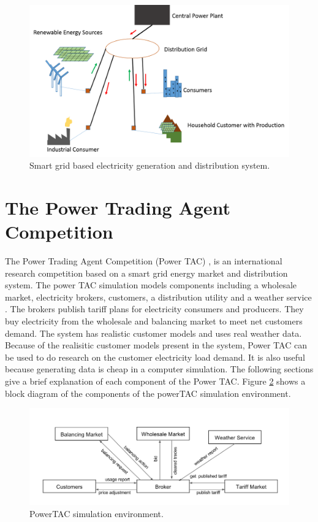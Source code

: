 \begin{figure}[h]
  \includegraphics[width=\linewidth]{smart-grid.png}
  \caption{Smart grid based electricity generation and distribution system.}
  \label{fig:smartgrid}
\end{figure}

\section{The Power Trading Agent Competition}

The Power Trading Agent Competition (Power TAC) \cite{ketter2013power, ketter20162016}, is an international research competition based on a smart grid energy market and distribution system. The power TAC simulation models components including a wholesale market, electricity brokers, customers, a distribution utility and a weather service \cite{ketter20162016}. The brokers publish tariff plans for electricity consumers and producers. They buy electricity from the wholesale and balancing market to meet net customers demand. The system has realistic customer models and uses real weather data. Because of the realisitic customer models present in the system, Power TAC can be used to do research on the customer electricity load demand. It is also useful because generating data is cheap in a computer simulation. The following sections give a brief explanation of each component of the Power TAC. Figure \ref{fig:simulation-environment}  shows a block diagram of the components of the powerTAC simulation environment.

\begin{figure}[!h]
  \includegraphics[width=\linewidth]{simulation-environment.png}
  \caption{PowerTAC simulation environment.}
  \label{fig:simulation-environment}
\end{figure}

